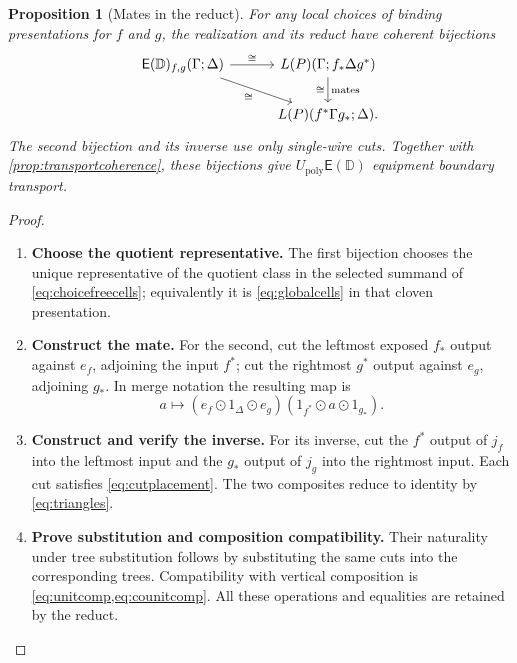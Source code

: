 \documentclass[11pt,reqno]{amsart}
\theoremstyle{plain}
\newtheorem{proposition}[theorem]{Proposition}
\theoremstyle{definition}
\theoremstyle{remark}
\numberwithin{equation}{section}
\newcommand{\D}{\mathbb D}
\newcommand{\E}{\mathsf E}
\newcommand{\Up}{U_{\mathrm{poly}}}
\newcommand{\wh}{\mathbin{\odot}}
\begin{document}
\begin{proposition}[Mates in the reduct]\label{prop:mates}
For any local choices of binding presentations for $f$ and $g$, the
realization and its reduct have coherent bijections
\begin{equation}\label{eq:mates}
\begin{tikzcd}[column sep=3em]
\E(\D)_{f,g}(\Gamma;\Delta)
  \arrow[r,"\cong"] \arrow[dr,"\cong"'] &
L(P)(\Gamma;f_*\Delta g^*) \arrow[d,"\text{mates}","\cong"']\\
& L(P)(f^*\Gamma g_*;\Delta).
\end{tikzcd}
\end{equation}
The second bijection and its inverse use only single-wire cuts.
Together with \cref{prop:transportcoherence}, these bijections give
$\Up\E(\D)$ equipment boundary transport.
\end{proposition}
\begin{proof}\leavevmode
\begin{enumerate}
\item \textbf{Choose the quotient representative.} The first bijection chooses the unique representative of the quotient class
in the selected summand of \cref{eq:choicefreecells}; equivalently it is
\cref{eq:globalcells} in that cloven presentation.

\item \textbf{Construct the mate.} For the second, cut the
leftmost exposed $f_*$ output against $e_f$, adjoining the input $f^*$;
cut the rightmost $g^*$ output against $e_g$, adjoining $g_*$. In merge
notation the resulting map is
\[
 a\longmapsto
 (e_f\wh1_\Delta\wh e_g)(1_{f^*}\wh a\wh1_{g_*}).
\]

\item \textbf{Construct and verify the inverse.} For its inverse, cut the $f^*$ output of $j_f$ into the leftmost input
and the $g_*$ output of $j_g$ into the rightmost input. Each cut satisfies
\cref{eq:cutplacement}. The two composites reduce to identity by
\cref{eq:triangles}.

\item \textbf{Prove substitution and composition compatibility.} Their naturality under tree substitution follows
by substituting the same cuts into the corresponding trees. Compatibility
with vertical composition is \cref{eq:unitcomp,eq:counitcomp}. All
these operations and equalities are retained by the reduct.\qedhere
\end{enumerate}
\end{proof}
\end{document}
